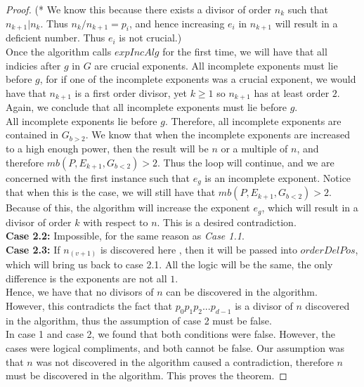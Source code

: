 \documentclass[../paper.tex]{subfiles}
\begin{document}
\begin{proof}
(* We know this
because there exists a divisor of order $n_k$ such that $n_{k + 1}
| n_k$. Thus $n_k / n_{k+1} = p_i$, and hence increasing $e_i$ in
$n_{k + 1}$ will result in a deficient number. Thus $e_i$ is not
crucial.)
\\

  Once the algorithm calls $expIncAlg$ for the first time, we
will have that all indicies after $g$ in $G$ are crucial 
exponents. All incomplete exponents must lie before $g$, for if
one of the incomplete exponents was a crucial exponent, we would
have that $n_{k + 1}$ is a first order divisor, yet $k \geq 1$ so
$n_{k+1}$ has at least order $2$. Again, we conclude that all
incomplete exponents must lie before $g$. 
\\

  All incomplete exponents lie before $g$. Therefore,
all incomplete exponents are contained in $G_{b>2}$. We know that
when the incomplete exponents are increased to a high enough
power, then the result will be $n$ or a multiple of $n$, and
therefore $mb(P,E_{k+1},G_{b<2}) > 2$. Thus the loop will
continue, and we are concerned with the first instance such that
$e_g$ is an incomplete exponent. Notice that when this is the
case, we will still have that $mb(P,E_{k+1},G_{b<2}) > 2$. 
Because of this, the algorithm will increase the exponent $e_g$,
which will result in a divisor of order $k$ with respect to $n$.
This is a desired contradiction.
\\

\textbf{Case 2.2:}
Impossible, for the same reason as \textit{Case 1.1}.
\\

\textbf{Case 2.3:}
If $n_{(v+1)}$ is discovered here , then it will be passed into
$orderDelPos$, which will bring us back to case 2.1. All the logic
will be the same, the only difference is the exponents are not all
$1$.
\\

Hence, we have that no divisors of $n$ can be discovered in the
algorithm. However, this
contradicts the fact that $p_0 p_1 p_2 ... p_{d-1}$ is a divisor
of $n$ discovered in the algorithm, thus the assumption of case 2 
must be false.
\\

In case 1 and case 2, we found that both conditions were false.
However, the cases were logical compliments, and both cannot be
false. Our assumption was that $n$ was not discovered in
the algorithm caused a contradiction, therefore $n$ must be
discovered in the algorithm. This proves the theorem.

\end{proof}
\end{document}
